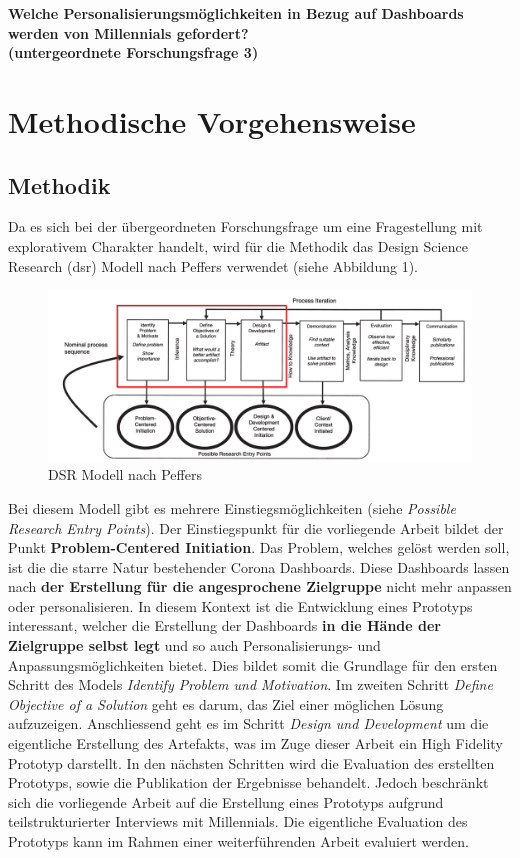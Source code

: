 \documentclass[12pt, oneside]{article}
\begin{document}
\begin{center}
\textbf{Welche Personalisierungsmöglichkeiten in Bezug auf Dashboards werden von Millennials gefordert?\\
(untergeordnete Forschungsfrage 3)}
\end{center}

\clearpage
\section{Methodische Vorgehensweise}
\subsection{Methodik}
Da es sich bei der übergeordneten Forschungsfrage um eine Fragestellung mit explorativem Charakter handelt, wird für die Methodik das Design Science Research (\Gls{dsr}) Modell nach Peffers verwendet (siehe Abbildung 1).


\begin{figure}[ht]
	\includegraphics[width=12cm]{images/peffers_dsr_model.png}
	\centering
	\caption{DSR Modell nach Peffers ~\citep{K.Peffers.2007}}
\end{figure}

Bei diesem Modell gibt es mehrere Einstiegsmöglichkeiten (siehe \textit{Possible Research Entry Points}). Der Einstiegspunkt für die vorliegende Arbeit bildet der Punkt \textbf{Problem-Centered Initiation}. Das Problem, welches gelöst werden soll, ist die die starre Natur bestehender Corona Dashboards. Diese Dashboards lassen nach \textbf{der Erstellung für die angesprochene Zielgruppe} nicht mehr anpassen oder personalisieren. In diesem Kontext ist die Entwicklung eines Prototyps interessant, welcher die Erstellung der Dashboards \textbf{in die Hände der Zielgruppe selbst legt} und so auch Personalisierungs- und Anpassungsmöglichkeiten bietet. Dies bildet somit die Grundlage für den ersten Schritt des Models \textit{Identify Problem und Motivation}. Im zweiten Schritt \textit{Define Objective of a Solution} geht es darum, das Ziel einer möglichen Lösung aufzuzeigen. Anschliessend geht es im Schritt \textit{Design und Development} um die eigentliche Erstellung des Artefakts, was im Zuge dieser Arbeit ein High Fidelity Prototyp darstellt. In den nächsten Schritten wird die Evaluation des erstellten Prototyps, sowie die Publikation der Ergebnisse behandelt. Jedoch beschränkt sich die vorliegende Arbeit auf die Erstellung eines Prototyps aufgrund teilstrukturierter Interviews mit Millennials. Die eigentliche Evaluation des Prototyps kann im Rahmen einer weiterführenden Arbeit evaluiert werden.
\end{document}
